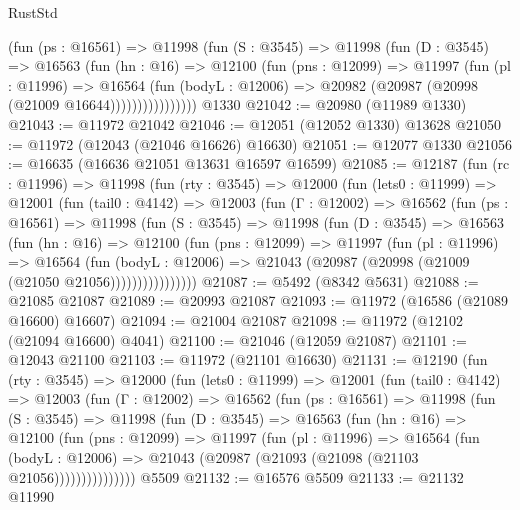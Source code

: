 \begin{lexlean}{RustStd}
\begin{coremodule}
                (fun (ps : @16561) =>
                @11998
                  (fun (S : @3545) =>
                  @11998
                    (fun (D : @3545) =>
                    @16563
                      (fun (hn : @16) =>
                      @12100
                        (fun (pns : @12099) =>
                        @11997
                          (fun (pl : @11996) =>
                          @16564
                            (fun (bodyL : @12006) =>
                            @20982 (@20987 (@20998 (@21009 @16644))))))))))))))))
    @1330
@21042 := @20980 (@11989 @1330)
@21043 := @11972 @21042
@21046 := @12051 (@12052 @1330) @13628
@21050 := @11972 (@12043 (@21046 @16626) @16630)
@21051 := @12077 @1330
@21056 := @16635 (@16636 @21051 @13631 @16597 @16599)
@21085 := @12187
    (fun (rc : @11996) =>
    @11998
      (fun (rty : @3545) =>
      @12000
        (fun (lets0 : @11999) =>
        @12001
          (fun (tail0 : @4142) =>
          @12003
            (fun (Γ : @12002) =>
            @16562
              (fun (ps : @16561) =>
              @11998
                (fun (S : @3545) =>
                @11998
                  (fun (D : @3545) =>
                  @16563
                    (fun (hn : @16) =>
                    @12100
                      (fun (pns : @12099) =>
                      @11997
                        (fun (pl : @11996) =>
                        @16564
                          (fun (bodyL : @12006) =>
                          @21043 (@20987 (@20998 (@21009 (@21050 @21056))))))))))))))))
@21087 := @5492 (@8342 @5631)
@21088 := @21085 @21087
@21089 := @20993 @21087
@21093 := @11972 (@16586 (@21089 @16600) @16607)
@21094 := @21004 @21087
@21098 := @11972 (@12102 (@21094 @16600) @4041)
@21100 := @21046 (@12059 @21087)
@21101 := @12043 @21100
@21103 := @11972 (@21101 @16630)
@21131 := @12190
    (fun (rty : @3545) =>
    @12000
      (fun (lets0 : @11999) =>
      @12001
        (fun (tail0 : @4142) =>
        @12003
          (fun (Γ : @12002) =>
          @16562
            (fun (ps : @16561) =>
            @11998
              (fun (S : @3545) =>
              @11998
                (fun (D : @3545) =>
                @16563
                  (fun (hn : @16) =>
                  @12100
                    (fun (pns : @12099) =>
                    @11997
                      (fun (pl : @11996) =>
                      @16564
                        (fun (bodyL : @12006) =>
                        @21043 (@20987 (@21093 (@21098 (@21103 @21056)))))))))))))))
    @5509
@21132 := @16576 @5509
@21133 := @21132 @11990

\end{coremodule}
\end{lexlean}
